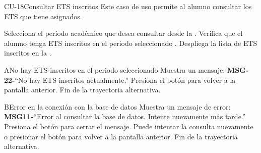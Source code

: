 

\begin{UseCase}{CU-18}{Consultar ETS inscritos}{
		Este caso de uso permite al alumno consultar los ETS que tiene asignados.
	}
\end{UseCase}
\begin{UCtrayectoria}
	\UCpaso[\UCactor] Selecciona el período académico que desea consultar desde la .
	\UCpaso Verifica que el alumno tenga ETS inscritos en el periodo seleccionado .
	\UCpaso Despliega la lista de ETS inscritos en la .
\end{UCtrayectoria}

\begin{UCtrayectoriaA}{A}{No hay ETS inscritos en el periodo seleccionado}
	\UCpaso Muestra un mensaje: {\bf MSG-22-}{``No hay ETS inscritos actualmente.''}
	\UCpaso[\UCactor] Presiona el botón  para volver a la pantalla anterior.
	\UCpaso Fin de la trayectoria alternativa.
\end{UCtrayectoriaA}
\begin{UCtrayectoriaA}{B}{Error en la conexión con la base de datos}
	\UCpaso Muestra un mensaje de error: {\bf MSG11-}{``Error al consultar la base de datos. Intente nuevamente más tarde.''}
	\UCpaso[\UCactor] Presiona el botón  para cerrar el mensaje.
	\UCpaso[\UCactor] Puede intentar la consulta nuevamente o presionar el botón  para volver a la pantalla anterior.
	\UCpaso Fin de la trayectoria alternativa.
\end{UCtrayectoriaA}


